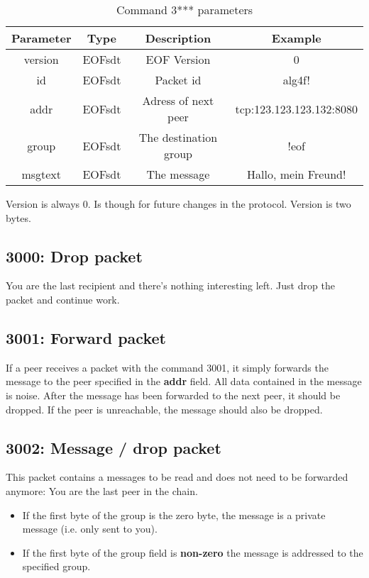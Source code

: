 \begin{longtable}{|c|c|c|c|}
\caption{Command 3*** parameters}\\
\hline
\textbf{Parameter} & \textbf{Type} & \textbf{Description} & \textbf{Example}\\
\hline
version & EOFsdt & EOF Version & 0\\
\hline
id & EOFsdt & Packet id & alg4f!\\
\hline
addr & EOFsdt & Adress of next peer & tcp:123.123.123.132:8080\\
\hline
group & EOFsdt & The destination group & !eof\\
\hline
msgtext & EOFsdt & The message & Hallo, mein Freund!\\
\hline
\end{longtable}
Version is always 0. Is though for future changes in the protocol.
Version is two bytes.
\subsection{3000: Drop packet}
You are the last recipient and there's nothing interesting left.
Just drop the packet and continue work.
\subsection{3001: Forward packet}
If a peer receives a packet with the command 3001, it simply forwards
the message to the peer specified in the \textbf{addr} field.
All data contained in the message
is noise. After the message has been forwarded to the next peer, it
should be dropped. If the peer is unreachable, the message should also
be dropped.
\subsection{3002: Message / drop packet}
This packet contains a messages to be read and does not need to be forwarded
anymore: You are the last peer in the chain.
\begin{itemize}
\item If the first byte of the group is the zero byte, the message
is a private message (i.e. only sent to you).
\item If the first byte of the group field is \textbf{non-zero} the message
is addressed to the specified group.
\end{itemize}
